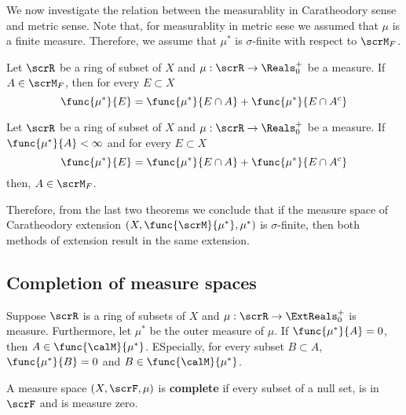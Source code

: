 We now investigate the relation between the measurablity in Caratheodory sense and metric sense. Note that, for measurablity in metric sese we assumed that \(\mu\) is a finite measure. Therefore, we assume that \(\mu^{\ast}\) is \(\sigma\)-finite with respect to \(\scrM_F\).

\begin{theorem}
    Let \(\scrR\) be a ring of subset of \(X\) and \(\mu:\scrR \to \Reals^+_0\) be a measure. If \(A \in \scrM_F\), then for every \(E \subset X\)
    \begin{equation*}
        \func{\mu^{\ast}}{E} = \func{\mu^{\ast}}{E \cap A} +  \func{\mu^{\ast}}{E \cap A^c}
    \end{equation*}
\end{theorem}

\begin{theorem}
    Let \(\scrR\) be a ring of subset of \(X\) and \(\mu:\scrR \to \Reals^+_0\) be a measure. If \(\func{\mu^{\ast}}{A} < \infty \) and for every \(E \subset X\)
    \begin{equation*}
        \func{\mu^{\ast}}{E} = \func{\mu^{\ast}}{E \cap A} +  \func{\mu^{\ast}}{E \cap A^c}
    \end{equation*}
    then, \(A \in \scrM_F\).
\end{theorem}
Therefore, from the last two theorems we conclude that if the measure space of Caratheodory extension \((X,\func{\scrM}{\mu^{\ast}},\mu^{\ast})\) is \(\sigma\)-finite, then both methods of extension result in the same extension. 

\subsection{Completion of measure spaces}
\begin{lemma}
    Suppose \(\scrR\) is a ring of subsets of \(X\) and \(\mu:\scrR \to \ExtReals^+_0\) is measure. Furthermore, let \(\mu^{\ast}\) be the outer measure of \(\mu\). If \(\func{\mu^{\ast}}{A} = 0\), then \(A \in \func{\calM}{\mu^{\ast}}\). ESpecially, for every subset \(B \subset A\), \(\func{\mu^{\ast}}{B} = 0\) and \(B \in \func{\calM}{\mu^{\ast}}\).
\end{lemma}

\begin{definition}
    A measure space \((X,\scrF,\mu)\) is \textbf{complete} if every subset of a null set, is in \(\scrF\) and is measure zero. 
\end{definition}

